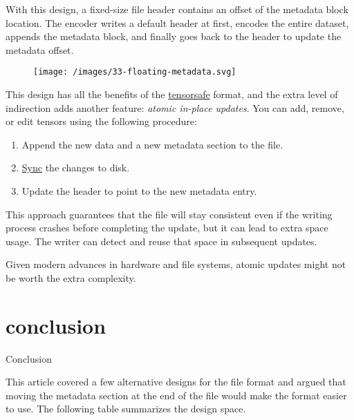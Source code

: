 \documentclass{article}
\begin{document}
With this design, a fixed-size file header contains an offset of the metadata block location.
The encoder writes a default header at first,
encodes the entire dataset,
appends the metadata block,
and finally goes back to the header to update the metadata offset.

\begin{figure}[grayscale-diagram]
\texttt{[image: /images/33-floating-metadata.svg]}
\end{figure}

This design has all the benefits of the \href{#tensor-safes}{tensorsafe} format,
and the extra level of indirection adds another feature: \emph{atomic in-place updates}.
You can add, remove, or edit tensors using the following procedure:
\begin{enumerate}
\item Append the new data and a new metadata section to the file.
\item \href{https://www.man7.org/linux/man-pages/man2/fsync.2.html}{Sync} the changes to disk.
\item Update the header to point to the new metadata entry.
\end{enumerate}

This approach guarantees that the file will stay consistent
even if the writing process crashes before completing the update,
but it can lead to extra space usage.
The writer can detect and reuse that space in subsequent updates.

Given modern advances in hardware and file systems,
atomic updates might not be worth the extra complexity.

\section{conclusion}{Conclusion}

This article covered a few alternative designs for the  file format
and argued that moving the metadata section at the end of the file would make the format easier to use.
The following table summarizes the design space.
\end{document}
